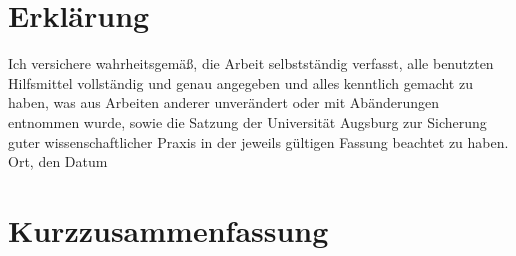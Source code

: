 \documentclass[12pt,a4paper]{scrartcl}
\numberwithin{equation}{section}
\begin{document}
    \section*{Erklärung}
  
  Ich  versichere  wahrheitsgemäß,  die  Arbeit selbstständig verfasst,  alle  benutzten  Hilfsmittel  vollständig  und  genau  angegeben  und  alles kenntlich  gemacht  zu  haben,  was  aus  Arbeiten  anderer  unverändert  oder  mit  Abänderungen entnommen  wurde,  sowie die Satzung  der  Universität Augsburg  zur  Sicherung guter wissenschaftlicher Praxis in der jeweils gültigen Fassung beachtet zu haben.
  \\[2ex] 
  
  \noindent
  Ort, den Datum\\[5ex]
 
\newpage
\section*{Kurzzusammenfassung}
\end{document}
